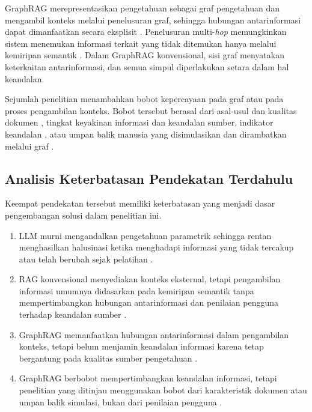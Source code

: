 GraphRAG merepresentasikan pengetahuan sebagai graf pengetahuan dan mengambil konteks melalui penelusuran graf, sehingga hubungan antarinformasi dapat dimanfaatkan secara eksplisit \autocite{WangXL2026, Syeda2026, Zhu2026}. Penelusuran multi-\emph{hop} memungkinkan sistem menemukan informasi terkait yang tidak ditemukan hanya melalui kemiripan semantik \autocite{Kamalipour2026}. Dalam GraphRAG konvensional, sisi graf menyatakan keterkaitan antarinformasi, dan semua simpul diperlakukan setara dalam hal keandalan.

Sejumlah penelitian menambahkan bobot kepercayaan pada graf atau pada proses pengambilan konteks. Bobot tersebut berasal dari asal-usul dan kualitas dokumen \autocite{Shi2026}, tingkat keyakinan informasi dan keandalan sumber, indikator keandalan \autocite{Asghari2026}, atau umpan balik manusia yang disimulasikan dan dirambatkan melalui graf \autocite{LiTrustProp2026}.


\FloatBarrier
\subsection{Analisis Keterbatasan Pendekatan Terdahulu}
\label{subsec:analisis-keterbatasan}

Keempat pendekatan tersebut memiliki keterbatasan yang menjadi dasar pengembangan solusi dalam penelitian ini.

\begin{enumerate}
    \item LLM murni mengandalkan pengetahuan parametrik sehingga rentan menghasilkan halusinasi ketika menghadapi informasi yang tidak tercakup atau telah berubah sejak pelatihan \autocite{Huang2025, YizhengHuang2026}.

    \item RAG konvensional menyediakan konteks eksternal, tetapi pengambilan informasi umumnya didasarkan pada kemiripan semantik tanpa mempertimbangkan hubungan antarinformasi dan penilaian pengguna terhadap keandalan sumber \autocite{WangXL2026, Syeda2026}.

    \item GraphRAG memanfaatkan hubungan antarinformasi dalam pengambilan konteks, tetapi belum menjamin keandalan informasi karena tetap bergantung pada kualitas sumber pengetahuan \autocite{WangXL2026, Yang2025}.

    \item GraphRAG berbobot mempertimbangkan keandalan informasi, tetapi penelitian yang ditinjau menggunakan bobot dari karakteristik dokumen atau umpan balik simulasi, bukan dari penilaian pengguna \autocite{Shi2026, LiTrustProp2026}.
\end{enumerate}


